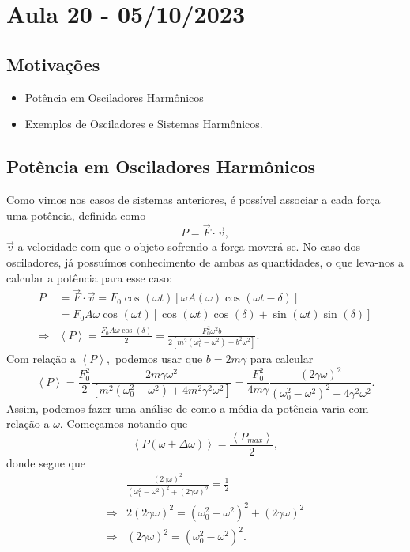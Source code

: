 \documentclass[physicsII_notes.tex]{subfiles}
\begin{document}
\section{Aula 20 - 05/10/2023}
\subsection{Motivações}
\begin{itemize}
	\item Potência em Osciladores Harmônicos
	\item Exemplos de Osciladores e Sistemas Harmônicos.
\end{itemize}
\subsection{Potência em Osciladores Harmônicos}
Como vimos nos casos de sistemas anteriores, é possível associar a cada força uma potência, definida como
\[
	P = \vec{F}\cdot \vec{v},
\]
\(\vec{v}\) a velocidade com que o objeto sofrendo a força moverá-se. No caso dos osciladores, já possuímos conhecimento
de ambas as quantidades, o que leva-nos a calcular a potência para esse caso:
\begin{align*}
	P           & = \vec{F}\cdot \vec{v} = F_{0}\cos^{}{(\omega t)}[\omega A(\omega )\cos^{}{(\omega t-\delta )}]                                                 \\
	            & =F_{0}A\omega \cos^{}{(\omega t)}[\cos^{}{(\omega t)}\cos^{}{(\delta )} + \sin^{}{(\omega t)}\sin^{}{(\delta )}]                                \\
	\Rightarrow & \left< P\right> = \frac{F_{0}A\omega \cos^{}{(\delta )}}{2} = \frac{F_{0}^{2}\omega^{2}b}{2[m^{2}(\omega_{0}^{2}-\omega^{2})+b^{2}\omega^{2}]}.
\end{align*}
Com relação a \(\left< P \right>,\) podemos usar que \(b = 2m\gamma \) para calcular
\[
	\left< P \right> = \frac{F_{0}^{2}}{2}\frac{2m\gamma \omega^{2}}{[m^{2}(\omega_{0}^{2}-\omega^{2}) + 4m^{2}\gamma^{2}\omega^{2}]} = \frac{F_{0}^{2}}{4m\gamma }\frac{(2\gamma \omega )^{2}}{(\omega_{0}^{2}-\omega ^{2})^{2}+4\gamma^{2}\omega^{2}}.
\]
Assim, podemos fazer uma análise de como a média da potência varia com relação a \(\omega \). Começamos notando que
\[
	\left< P(\omega \pm \Delta \omega ) \right> = \frac{\left< P_{max} \right>}{2},
\]
donde segue que
\begin{align*}
	            & \frac{(2\gamma \omega )^{2}}{(\omega_{0}^{2}-\omega ^{2})^{2}+(2\gamma \omega )^{2}} = \frac{1}{2} \\
	\Rightarrow & 2(2\gamma \omega )^{2} = (\omega_{0}^{2}-\omega ^{2})^{2}+(2\gamma \omega )^{2}                    \\
	\Rightarrow & (2\gamma \omega )^{2}=(\omega_{0}^{2}-\omega ^{2})^{2}.
\end{align*}
\end{document}

